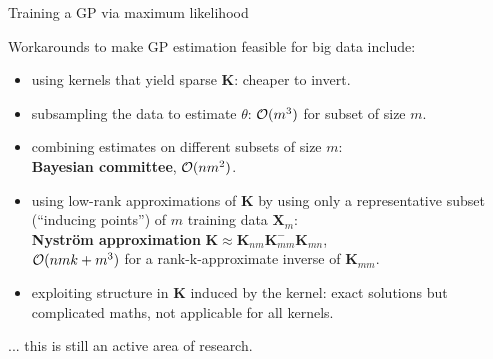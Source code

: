 \documentclass[11pt,compress,t,notes=noshow, xcolor=table]{beamer}
\begin{document}
\begin{vbframe}{Training a GP via maximum likelihood}
\framebreak 

Workarounds to make GP estimation feasible for big data include:
\begin{itemize}
\item using kernels that yield sparse $\bm K$: cheaper to invert.
\item subsampling the data to estimate $\theta$: $\mathcal{O}(m^3)$ for subset of size $m$.
\item combining estimates on different subsets of size $m$:\\ \textbf{Bayesian committee}, $\mathcal{O}(n m^2)$.
\item using low-rank approximations of $\bm{K}$ by using only a representative subset (\enquote{inducing points}) of $m$ training data $\bm X_m$:\\ \textbf{Nyström approximation} $\bm K \approx \bm K_{nm} \bm K_{mm}^{-} \bm K_{mn}$,\\ $\mathcal{O}(nmk + m^3)$ for a rank-k-approximate inverse of $\bm K_{mm}$.
\item exploiting structure in $\bm{K}$ induced by the kernel: exact solutions but complicated maths, not  applicable for all kernels.
\end{itemize}

... this is still an active area of research.

\end{vbframe}

% 
% 
% 
% 
% 
% 

\endlecture
\end{document}
